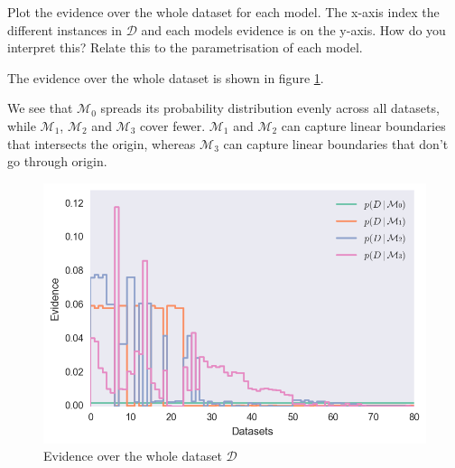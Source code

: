 \documentclass[12pt]{article}
\newenvironment{question}[2][Question]{\begin{trivlist}
\kern10pt
\item[\hskip \labelsep {\bfseries #1}\hskip \labelsep {\bfseries #2.}]}{\end{trivlist}}
\newcommand*{\answer}{%
  \par
  \kern1pt
  \begingroup
    \centering
    \raisebox{.2\baselineskip}{%
      \textcolor{gray}{
	    \rule{.6667\linewidth}{.1pt}%
      }
    }%
    \par
  \kern8pt
  \endgroup
}
\begin{document}
\begin{question}{27}
Plot the evidence over the whole dataset for each model. The x-axis index the different instances in $\mathcal{D}$ and each models evidence is on the y-axis. How do you interpret this?
Relate this to the parametrisation of each model.

\answer

The evidence over the whole dataset is shown in figure \ref{evidence}.

We see that $\mathcal{M}_0$ spreads its probability distribution evenly across all datasets, while $\mathcal{M}_1$, $\mathcal{M}_2$ and $\mathcal{M}_3$ cover fewer. $\mathcal{M}_1$ and $\mathcal{M}_2$ can capture linear boundaries that intersects the origin, whereas $\mathcal{M}_3$ can capture linear boundaries that don't go through origin.

\begin{figure}
\includegraphics[]{evidence}
\centering
\caption{Evidence over the whole dataset $\mathcal{D}$}
\label{evidence}
\end{figure}
\end{question}
\end{document}
